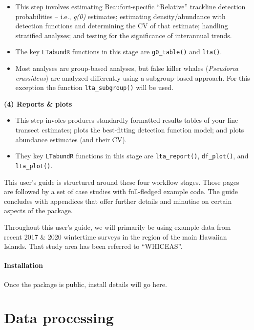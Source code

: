 \documentclass[
]{book}
\begin{document}
\begin{itemize}
\item
  This step involves estimating Beaufort-specific ``Relative'' trackline detection probabilities -- i.e., \emph{g(0)} estimates; estimating density/abundance with detection functions and determining the CV of that estimate; handling stratified analyses; and testing for the significance of interannual trends.
\item
  The key \texttt{LTabundR} functions in this stage are \texttt{g0\_table()} and \texttt{lta()}.
\item
  Most analyses are group-based analyses, but false killer whales (\emph{Pseudorca crassidens}) are analyzed differently using a subgroup-based approach. For this exception the function \texttt{lta\_subgroup()} will be used.
\end{itemize}

\textbf{(4) Reports \& plots}

\begin{itemize}
\item
  This step involes produces standardly-formatted results tables of your line-transect estimates; plots the best-fitting detection function model; and plots abundance estimates (and their CV).
\item
  They key \texttt{LTabundR} functions in this stage are \texttt{lta\_report()}, \texttt{df\_plot()}, and \texttt{lta\_plot()}.
\end{itemize}

This user's guide is structured around these four workflow stages. Those pages are followed by a set of case studies with full-fledged example code. The guide concludes with appendices that offer further details and minutiae on certain aspects of the package.

Throughout this user's guide, we will primarily be using example data from recent 2017 \& 2020 wintertime surveys in the region of the main Hawaiian Islands. That study area has been referred to ``WHICEAS''.

\hypertarget{installation}{%
\subsection*{Installation}\label{installation}}

Once the package is public, install details will go here.

\hypertarget{part-data-processing}{%
\part{Data processing}\label{part-data-processing}}
\end{document}
